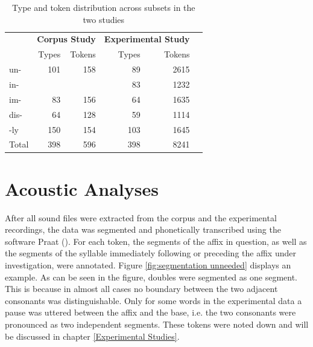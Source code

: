 \begin{table}[h!]
	\caption{Type and token distribution across subsets in the two studies}
	\label{tbl:token distribution both studies}
	\begin{center}
		\begin{tabular}{lrrrrr}
			
		&	\multicolumn{2}{r}{\textbf{Corpus Study} } &\multicolumn{2}{r}{\textbf{Experimental Study}} \vspace*{0.3cm}
		\\ 

			& Types & Tokens & \hspace*{3cm} Types & Tokens \\
			\hline
			{un-} \hspace*{1cm} & 101&158 &89 & 2615\\
			{in-}&&& 83 & 1232\\ 
			{im-}& 83 & 156 &  64&  1635\\ 
			{dis-} &64& 128 &59&1114  \\ 
			{-ly}& 150&  154 & 103& 1645 \\ 
			\hline
			Total & 398 & 596& 398& 8241\\
			
			\hline


		\end{tabular}
	\end{center}
\end{table}









\section{Acoustic Analyses}\label{Acoustic Analysis}
After all sound files were extracted from the corpus and the experimental recordings, the data was segmented and phonetically transcribed using the software Praat (\citealt{Boersma.2014}). For each token, the segments of the affix in question, as well as the segments of the syllable immediately following or preceding the affix under investigation, were annotated. Figure \ref{fig:segmentation unneeded} displays an example. As can be seen in the figure, doubles were segmented as one segment. This is because in almost all cases no boundary between the two adjacent consonants was distinguishable. Only for some words in the experimental data a pause was uttered between the affix and the base, i.e. the two consonants were pronounced as two independent segments. These tokens were noted down and will be discussed in chapter \ref{Experimental Studies}.

